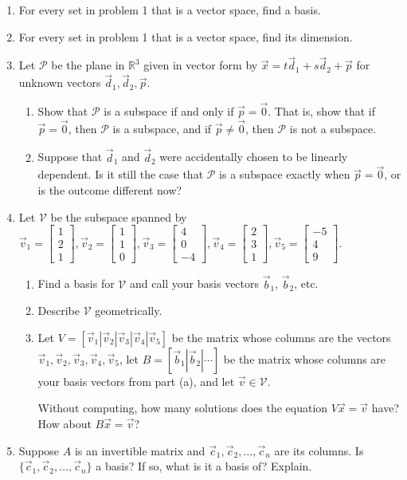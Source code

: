 \documentclass[letter]{article}
\newcommand{\R}{\mathbb{R}}
\newcommand{\mat}[1]{\begin{bmatrix}#1\end{bmatrix}}
\begin{document}
\begin{enumerate}
		\item For every set in problem 1 that is a vector space, find a basis.
		\item For every set in problem 1 that is a vector space, find its dimension.

		\item Let $\mathcal P$ be the plane in $\R^3$ given in vector form by
			$\vec x=t\vec d_1+s\vec d_2+\vec p$ for unknown vectors $\vec d_1,\vec d_2,\vec p$.
			\begin{enumerate}
				\item Show that $\mathcal P$ is a subspace if and only if $\vec p=\vec 0$.  That is, show
				that if $\vec p=\vec 0$, then $\mathcal P$ is a subspace, and if $\vec p\neq \vec 0$,
				then $\mathcal P$ is not a subspace.
				\item Suppose that $\vec d_1$ and $\vec d_2$ were accidentally chosen
					to be linearly dependent.  Is it still the case that $\mathcal P$ is
					a subspace exactly when $\vec p=\vec 0$, or is the outcome different now?
			\end{enumerate}
		\item Let $\mathcal V$ be the subspace spanned by $\vec v_1=\mat{1\\2\\1},\vec v_2=\mat{1\\1\\0},\vec v_3=\mat{4\\0\\-4},
			\vec v_4=\mat{2\\3\\1},\vec v_5=\mat{-5\\4\\9}$.
			\begin{enumerate}
				\item Find a basis for $\mathcal V$ and call your basis vectors $\vec b_1$, $\vec b_2$, etc.
				\item Describe $\mathcal V$ geometrically.
				\item Let $V=[\vec v_1|\vec v_2|\vec v_3|\vec v_4|\vec v_5]$ be the matrix whose columns are the vectors
					$\vec v_1,\vec v_2,\vec v_3,\vec v_4,\vec v_5$, let $B=[\vec b_1|\vec b_2|\cdots]$ be the matrix
					whose columns are your basis vectors from part (a), and let $\vec v\in \mathcal V$.

					Without computing, how many solutions does the equation $V\vec x=\vec v$ have?  How
					about $B\vec x=\vec v$?
			\end{enumerate}
		\item Suppose $A$ is an invertible matrix and $\vec c_1,\vec c_2,\ldots,\vec c_n$ are its columns.  Is
			$\{\vec c_1,\vec c_2,\ldots, \vec c_n\}$ a basis?  If so, what is it a basis of?  Explain.

	\end{enumerate}
\end{document}
